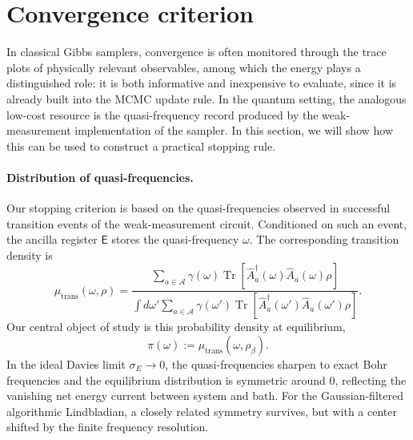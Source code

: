 \documentclass[showpacs,amsmath,amssymb,twocolumn,prx,superscriptaddress,10pt,aps,nofootinbib]{revtex4-2}
\newcommand{\rE}{\boldsymbol{\mathsf{E}}}
\begin{document}

\section{Convergence criterion}
\label{sec:convergence}

 In classical Gibbs samplers, convergence is often monitored through the trace plots of physically relevant observables, among which the energy plays a distinguished role: it is both informative and inexpensive to evaluate, since it is already built into the MCMC update rule. In the quantum setting, the analogous low-cost resource is the quasi-frequency record produced by the weak-measurement implementation of the sampler. In this section, we will show how this can be used to construct a practical stopping rule.

\paragraph{Distribution of quasi-frequencies.} Our stopping criterion is based on the quasi-frequencies observed in successful transition events of the weak-measurement circuit. Conditioned on such an event, the ancilla register \(\rE\) stores the quasi-frequency \(\omega\). The corresponding transition density is
\begin{equation}
\label{eq:mu_trans_main}
\mu_{\mathrm{trans}}(\omega,\rho)
=
\frac{
\sum_{a\in\mathcal{A}}
\gamma(\omega)\operatorname{Tr}\!\left[\hat A_a^\dagger(\omega)\hat A_a(\omega)\rho\right]
}{
\int d\omega'
\sum_{a\in\mathcal{A}}
\gamma(\omega')\operatorname{Tr}\!\left[\hat A_a^\dagger(\omega')\hat A_a(\omega')\rho\right]
}.
\end{equation}
Our central object of study is this probability density at equilibrium,
\begin{equation}
\label{eq:Pi_distribution_quasi_freq}
    \pi(\omega):=\mu_{\mathrm{trans}}(\omega,\rho_\beta).
\end{equation}
In the ideal Davies limit \(\sigma_E\to0\), the quasi-frequencies sharpen to exact Bohr frequencies and the equilibrium distribution is symmetric around \(0\), reflecting the vanishing net energy current between system and bath. For the Gaussian-filtered algorithmic Lindbladian, a closely related symmetry survives, but with a center shifted by the finite frequency resolution.
\end{document}
